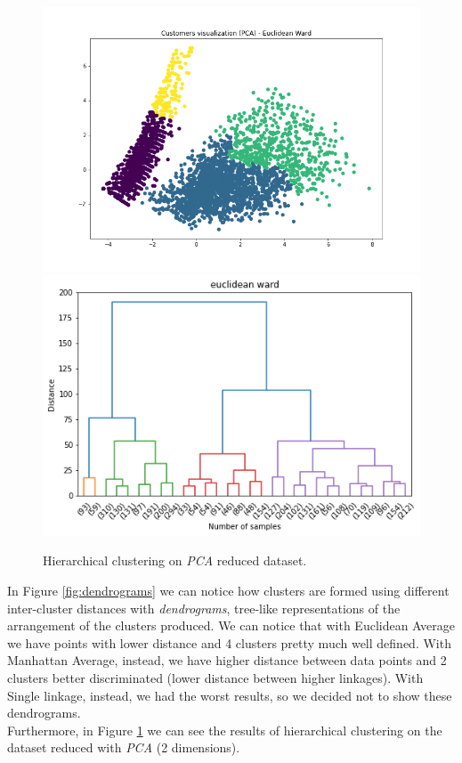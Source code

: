 \documentclass[12pt]{article}
\begin{document}
\begin{figure}[!h]
    \includegraphics[width=\linewidth]{images/figure_customers_Euclidean_Ward_pca.png}
\endminipage\hfill
{}
  \includegraphics[width=\linewidth]{images/figure_dendr_pca.png}
\endminipage\hfill
\caption{Hierarchical clustering on \textit{PCA} reduced dataset.}
\label{fig:hierarch_pca}
\end{figure}

In Figure \ref{fig:dendrograms} we can notice how clusters are formed using different inter-cluster distances with \textit{dendrograms}, tree-like representations of the arrangement of the clusters produced. We can notice that with Euclidean Average we have points with lower distance and 4 clusters pretty much well defined. With Manhattan Average, instead, we have higher distance between data points and 2 clusters better discriminated (lower distance between higher linkages). With Single linkage, instead, we had the worst results, so we decided not to show these dendrograms.\\
Furthermore, in Figure \ref{fig:hierarch_pca} we can see the results of hierarchical clustering on the dataset reduced with \textit{PCA} (2 dimensions).
\end{document}

